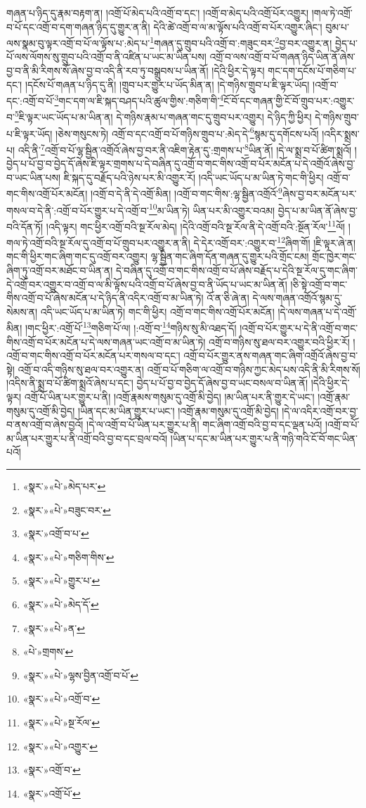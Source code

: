 གཞན་པ་ཉིད་དུ་རྣམ་བརྟག་ན། །འགྲོ་པོ་མེད་པའི་འགྲོ་བ་དང་། །འགྲོ་བ་མེད་པའི་འགྲོ་པོར་འགྱུར། །གལ་ཏེ་འགྲོ་བ་པོ་དང་འགྲོ་བ་དག་གཞན་ཉིད་དུ་གྱུར་ན་ནི། དེའི་ཚེ་འགྲོ་བ་ལ་མ་ལྟོས་པའི་འགྲོ་བ་པོར་འགྱུར་ཞིང་། བུམ་པ་ལས་སྣམ་བུ་ལྟར་འགྲོ་བ་པོ་ལ་ལྟོས་པ་:མེད་པ་\footnote{«སྣར་»«པེ་»མེད་པར་}གཞན་དུ་གྲུབ་པའི་འགྲོ་བ་:གཟུང་བར་\footnote{«སྣར་»«པེ་»བཟུང་བར་}བྱ་བར་འགྱུར་ན། བྱེད་པ་པོ་ལས་ལོགས་སུ་གྲུབ་པའི་འགྲོ་བ་ནི་འཛིན་པ་ཡང་མ་ཡིན་པས། འགྲོ་བ་ལས་འགྲོ་བ་པོ་གཞན་ཉིད་ཡིན་ནོ་ཞེས་བྱ་བ་ནི་མི་རིགས་སོ་ཞེས་བྱ་བ་འདི་ནི་རབ་ཏུ་བསྒྲུབས་པ་ཡིན་ནོ། །དེའི་ཕྱིར་དེ་ལྟར། གང་དག་དངོས་པོ་གཅིག་པ་དང་། །དངོས་པོ་གཞན་པ་ཉིད་དུ་ནི། །གྲུབ་པར་གྱུར་པ་ཡོད་མིན་ན། །དེ་གཉིས་གྲུབ་པ་ཇི་ལྟར་ཡོད། །འགྲོ་བ་དང་:འགྲོ་བ་པོ་\footnote{«སྣར་»འགྲོ་བ་པ་}གང་དག་ལ་ཇི་སྐད་བཤད་པའི་ཚུལ་གྱིས་:གཅིག་གི་\footnote{«སྣར་»«པེ་»གཅིག་གིས་}ངོ་བོ་དང་གཞན་གྱི་ངོ་བོ་གྲུབ་པར་:འགྱུར་བ་\footnote{«སྣར་»«པེ་»གྱུར་པ་}ཇི་ལྟར་ཡང་ཡོད་པ་མ་ཡིན་ན། དེ་གཉིས་རྣམ་པ་གཞན་གང་དུ་གྲུབ་པར་འགྱུར། དེ་ཉིད་ཀྱི་ཕྱིར། དེ་གཉིས་གྲུབ་པ་ཇི་ལྟར་ཡོད། །ཅེས་གསུངས་ཏེ། འགྲོ་བ་དང་འགྲོ་བ་པོ་གཉིས་གྲུབ་པ་:མེད་དེ་\footnote{«སྣར་»«པེ་»མེད་དོ་}སྙམ་དུ་དགོངས་པའོ། །འདིར་སྨྲས་པ། འདི་ནི་\footnote{«སྣར་»«པེ་»ན་}འགྲོ་བ་པོ་ལྷ་སྦྱིན་འགྲོའོ་ཞེས་བྱ་བར་ནི་འཇིག་རྟེན་དུ་:གྲགས་པ་\footnote{«པེ་»གྲགས་}ཡིན་ནོ། །དེ་ལ་སྨྲ་བ་པོ་ཚིག་སྨྲའོ། །བྱེད་པ་པོ་བྱ་བ་བྱེད་དོ་ཞེས་ཇི་ལྟར་གྲགས་པ་དེ་བཞིན་དུ་འགྲོ་བ་གང་གིས་འགྲོ་བ་པོར་མངོན་པ་དེ་འགྲོའོ་ཞེས་བྱ་བ་ཡང་ཡིན་པས། ཇི་སྐད་དུ་བརྗོད་པའི་ཉེས་པར་མི་འགྱུར་རོ། །འདི་ཡང་ཡོད་པ་མ་ཡིན་ཏེ་གང་གི་ཕྱིར། འགྲོ་བ་གང་གིས་འགྲོ་པོར་མངོན། །འགྲོ་བ་དེ་ནི་དེ་འགྲོ་མིན། །འགྲོ་བ་གང་གིས་:ལྷ་སྦྱིན་འགྲོའོ་\footnote{«སྣར་»«པེ་»ལྷས་བྱིན་འགྲོ་བ་པོ་}ཞེས་བྱ་བར་མངོན་པར་གསལ་བ་དེ་ནི་:འགྲོ་བ་པོར་གྱུར་པ་དེ་འགྲོ་བ་\footnote{«སྣར་»«པེ་»འགྲོ་བ་}མ་ཡིན་ཏེ། ཡིན་པར་མི་འགྱུར་བའམ། བྱེད་པ་མ་ཡིན་ནོ་ཞེས་བྱ་བའི་དོན་ཏོ། །འདི་ལྟར། གང་ཕྱིར་འགྲོ་བའི་སྔ་རོལ་མེད། །དེའི་འགྲོ་བའི་སྔ་རོལ་ནི་དེ་འགྲོ་བའི་:སྔོན་རོལ་\footnote{«སྣར་»«པེ་»སྔ་རོལ་}ལོ། །གལ་ཏེ་འགྲོ་བའི་སྔ་རོལ་དུ་འགྲོ་བ་པོ་གྲུབ་པར་འགྱུར་ན་ནི། དེ་དེར་འགྲོ་བར་:འགྱུར་བ་\footnote{«སྣར་»«པེ་»འགྱུར་}ཞིག་གོ། །ཇི་ལྟར་ཞེ་ན། གང་གི་ཕྱིར་གང་ཞིག་གང་དུ་འགྲོ་བར་འགྱུར། ལྷ་སྦྱིན་གང་ཞིག་དོན་གཞན་དུ་གྱུར་པའི་གྲོང་ངམ། གྲོང་ཁྱེར་གང་ཞིག་ཏུ་འགྲོ་བར་མཐོང་བ་ཡིན་ན། དེ་བཞིན་དུ་འགྲོ་བ་གང་གིས་འགྲོ་བ་པོ་ཞེས་བརྗོད་པ་དེའི་སྔ་རོལ་དུ་གང་ཞིག་དེ་འགྲོ་བར་འགྱུར་བ་འགྲོ་བ་ལ་མི་ལྟོས་པའི་འགྲོ་བ་པོ་ཞེས་བྱ་བ་ནི་ཡོད་པ་ཡང་མ་ཡིན་ནོ། །ཅི་སྟེ་འགྲོ་བ་གང་གིས་འགྲོ་བ་པོ་ཞེས་མངོན་པ་དེ་ཉིད་ནི་འདིར་འགྲོ་བ་མ་ཡིན་ཏེ། འོ་ན་ཅི་ཞེ་ན། དེ་ལས་གཞན་འགྲོའོ་སྙམ་དུ་སེམས་ན། འདི་ཡང་ཡོད་པ་མ་ཡིན་ཏེ། གང་གི་ཕྱིར། འགྲོ་བ་གང་གིས་འགྲོ་པོར་མངོན། །དེ་ལས་གཞན་པ་དེ་འགྲོ་མིན། །གང་ཕྱིར་:འགྲོ་པོ་\footnote{«སྣར་»འགྲོ་བ་}གཅིག་པོ་ལ། །:འགྲོ་བ་\footnote{«སྣར་»འགྲོ་པོ་}གཉིས་སུ་མི་འཐད་དོ། །འགྲོ་བ་པོར་གྱུར་པ་དེ་ནི་འགྲོ་བ་གང་གིས་འགྲོ་བ་པོར་མངོན་པ་དེ་ལས་གཞན་ཡང་འགྲོ་བ་མ་ཡིན་ཏེ། འགྲོ་བ་གཉིས་སུ་ཐལ་བར་འགྱུར་བའི་ཕྱིར་རོ། །འགྲོ་བ་གང་གིས་འགྲོ་བ་པོར་མངོན་པར་གསལ་བ་དང་། འགྲོ་བ་པོར་གྱུར་ནས་གཞན་གང་ཞིག་འགྲོའོ་ཞེས་བྱ་བ་སྟེ། འགྲོ་བ་འདི་གཉིས་སུ་ཐལ་བར་འགྱུར་ན། འགྲོ་བ་པོ་གཅིག་ལ་འགྲོ་བ་གཉིས་ཀྱང་མེད་པས་འདི་ནི་མི་རིགས་སོ། །འདིས་ནི་སྨྲ་བ་པོ་ཚིག་སྨྲའོ་ཞེས་པ་དང་། བྱེད་པ་པོ་བྱ་བ་བྱེད་དོ་ཞེས་བྱ་བ་ཡང་བསལ་བ་ཡིན་ནོ། །དེའི་ཕྱིར་དེ་ལྟར། འགྲོ་པོ་ཡིན་པར་གྱུར་པ་ནི། །འགྲོ་རྣམས་གསུམ་དུ་འགྲོ་མི་བྱེད། །མ་ཡིན་པར་ནི་གྱུར་དེ་ཡང་། །འགྲོ་རྣམ་གསུམ་དུ་འགྲོ་མི་བྱེད། །ཡིན་དང་མ་ཡིན་གྱུར་པ་ཡང་། །འགྲོ་རྣམ་གསུམ་དུ་འགྲོ་མི་བྱེད། །དེ་ལ་འདིར་འགྲོ་བར་བྱ་བ་ནས་འགྲོ་བ་ཞེས་བྱའོ། །དེ་ལ་འགྲོ་བ་པོ་ཡིན་པར་གྱུར་པ་ནི། གང་ཞིག་འགྲོ་བའི་བྱ་བ་དང་ལྡན་པའོ། །འགྲོ་བ་པོ་མ་ཡིན་པར་གྱུར་པ་ནི་འགྲོ་བའི་བྱ་བ་དང་བྲལ་བའོ། །ཡིན་པ་དང་མ་ཡིན་པར་གྱུར་པ་ནི་གཉི་གའི་ངོ་བོ་གང་ཡིན་པའོ། 